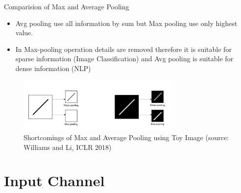 \begin{vbframe}{Comparision of Max and Average Pooling}
    \begin{itemize}
       \item Avg pooling use all information by sum but Max pooling use only highest value.
    \item In Max-pooling operation details are removed therefore it is suitable for sparse information (Image Classification) and Avg pooling is suitable for dense information (NLP) 

    \end{itemize}
    
 \begin{figure}
    \centering
    \includegraphics[width=8cm]{plots/08_pooling/comparepool.png}
    \caption{Shortcomings of Max and Average Pooling using Toy Image (source: Williams and Li, ICLR 2018)}
  \end{figure}
\end{vbframe}







\section{Input Channel}

